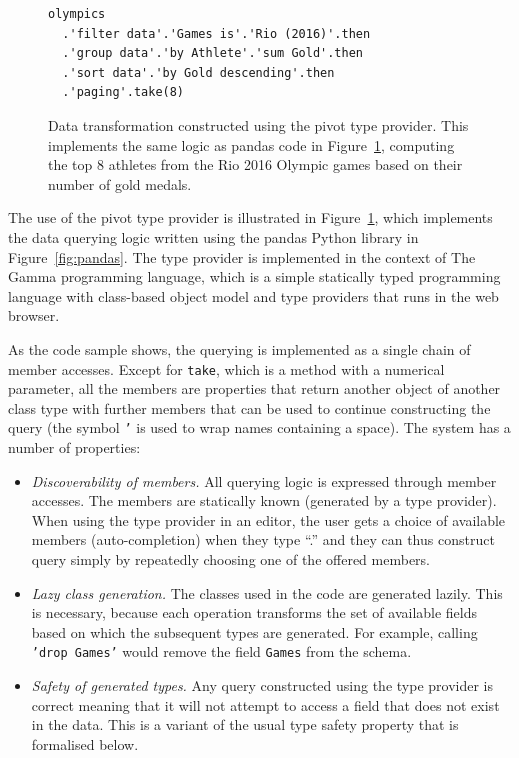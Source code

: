 \documentclass[fleqn,11pt]{report}
\theoremstyle{definition}
\newenvironment{nitemize}
{ \vspace{-0.4em}
  \begin{itemize}
    \setlength{\itemsep}{5pt}
    \setlength{\parskip}{0pt}
    \setlength{\parsep}{0pt} }
{ \end{itemize}
  \vspace{-0.4em} }
\begin{document}
\begin{figure}[t]
\vspace{-0.5em}
\begin{lstlisting}[language=sharp]
olympics
  .'filter data'.'Games is'.'Rio (2016)'.then
  .'group data'.'by Athlete'.'sum Gold'.then
  .'sort data'.'by Gold descending'.then
  .'paging'.take(8)
\end{lstlisting}
\vspace{-0.25em}
\caption{Data transformation constructed using the pivot type provider. This implements the
same logic as pandas code in Figure~\ref{fig:rio}, computing the top 8 athletes from the Rio 2016
Olympic games based on their number of gold medals.}
\label{fig:rio}
\vspace{-0.25em}
\end{figure}

The use of the pivot type provider is illustrated in Figure~\ref{fig:rio}, which implements
the data querying logic written using the pandas Python library in Figure~\ref{fig:pandas}.
The type provider is implemented in the context of The Gamma programming language, which is a
simple statically typed programming language with class-based object model and type providers
that runs in the web browser.

As the code sample shows, the querying is implemented as a single chain of member accesses.
Except for \texttt{take}, which is a method with a numerical parameter, all the members are
properties that return another object of another class type with further members that can be
used to continue constructing the query (the symbol \texttt{'} is used to wrap names containing
a space). The system has a number of properties:

\begin{nitemize}
\item \emph{Discoverability of members.} All querying logic is expressed through member accesses.
  The members are statically known (generated by a type provider). When using the type provider in
  an editor, the user gets a choice of available members (auto-completion) when they type ``.''
  and they can thus construct query simply by repeatedly choosing one of the offered members.

\item \emph{Lazy class generation.} The classes used in the code are generated lazily. This is
  necessary, because each operation transforms the set of available fields based on which the
  subsequent types are generated. For example, calling \texttt{'drop Games'} would remove the field
  \texttt{Games} from the schema.

\item \emph{Safety of generated types.} Any query constructed using the type provider is correct meaning that it
  will not attempt to access a field that does not exist in the data. This is a variant of the
  usual type safety property that is formalised below.
\end{nitemize}
\end{document}
